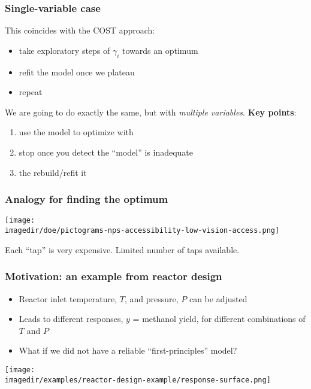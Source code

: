 \begin{frame}\frametitle{Single-variable case}

	This coincides with the COST approach:
	\begin{itemize}
		\item	take exploratory steps of $\gamma_i$ towards an optimum
		\item	refit the model once we plateau
		\item	repeat
	\end{itemize}
	
	\vspace{24pt}
	We are going to do exactly the same, but with \emph{multiple variables}. \textbf{Key points}: 
	\begin{enumerate}
		\item	use the model to optimize with
		\item	stop once you detect the ``model'' is inadequate
		\item	the rebuild/refit it
	\end{enumerate}
\end{frame}

\begin{frame}\frametitle{Analogy for finding the optimum}
	\begin{center}
		\texttt{[image: \\imagedir/doe/pictograms-nps-accessibility-low-vision-access.png]} %
	\end{center}
	Each ``tap'' is very expensive. Limited number of taps available.
\end{frame}

\begin{frame}\frametitle{Motivation: an example from reactor design}
	\begin{itemize}
		\item	Reactor inlet temperature, $T$, and pressure, $P$ can be adjusted
		\item	Leads to different responses, $y$ = methanol yield, for different combinations of $T$ and $P$
		\item	What if we did not have a reliable ``first-principles'' model?
	\end{itemize}
	\begin{center}
		\texttt{[image: \\imagedir/examples/reactor-design-example/response-surface.png]}
	\end{center}
\end{frame}

